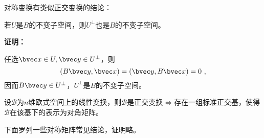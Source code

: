 对称变换有类似正交变换的结论：
\begin{theorem}{}
若$U$是$B$的不变子空间，则$U^{\bot}$也是$B$的不变子空间。
\end{theorem}
\textbf{证明：}

任选$\bvec x\in U,\bvec y\in U^{\bot}$，则
\begin{equation}
(B\bvec y,\bvec x)=(\bvec y,B\bvec x)=0~,
\end{equation}
因而$B\bvec y\in U^{\bot}$，$ U^{\bot}$是$B$的不变子空间。
\begin{exercise}{}
设$\mathcal B$为$n$维欧式空间上的线性变换，则$\mathcal B$是正交变换$\Longleftrightarrow$存在一组标准正交基，使得$\mathcal B$在该基下的表示为对角矩阵。
\end{exercise}
下面罗列一些对称矩阵常见结论，证明略。

